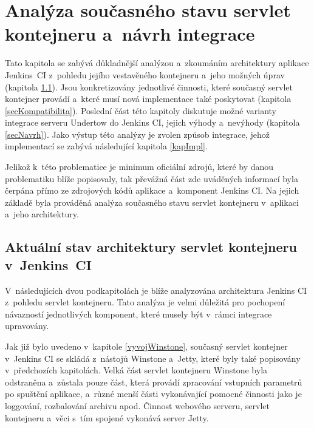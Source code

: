 \chapter{Analýza současného stavu servlet kontejneru a~návrh integrace}
    Tato kapitola se zabývá důkladnější analýzou a~zkoumáním architektury aplikace Jenkins~CI
    z~pohledu jejího vestavěného kontejneru a~jeho možných úprav (kapitola \ref{secArchitecture}). 
    Jsou konkretizovány jednotlivé činnosti, které současný servlet kontejner provádí
    a~které musí nová implementace také poskytovat (kapitola \ref{secKompatibilita}).
    Poslední část této kapitoly diskutuje možné varianty integrace serveru Undertow do Jenkins CI,
    jejich výhody a~nevýhody (kapitola \ref{secNavrh}). Jako výstup této analýzy je zvolen způsob integrace, jehož
    implementací se zabývá následující kapitola \ref{kapImpl}.

    Jelikož k~této problematice je minimum oficiální zdrojů, které by danou problematiku blíže popisovaly, 
    tak převážná část zde uváděných informací byla čerpána přímo ze zdrojových kódů aplikace a~komponent Jenkins CI.
    Na jejich základě byla prováděná analýza současného stavu servlet kontejneru v~aplikaci a~jeho architektury.
    
    \section{Aktuální stav architektury servlet kontejneru v~Jenkins~CI}\label{secArchitecture}
        V~následujících dvou podkapitolách je blíže analyzována architektura
        Jenkins CI z~pohledu servlet kontejneru. Tato analýza je velmi důležitá
        pro pochopení návazností jednotlivých komponent, které musely být v~rámci integrace upravovány.

        Jak již bylo uvedeno v~kapitole \ref{vyvojWinstone}, současný servlet kontejner 
        v~Jenkins CI se skládá z~nástojů Winstone a~Jetty, které byly také popisovány
        v~předchozích kapitolách. Velká část servlet
        kontejneru Winstone byla odstraněna a~zůstala pouze část, která
        provádí zpracování vstupních parametrů po spuštění aplikace, a~různé menší části
        vykonávající pomocné činnosti jako je loggování, rozbalování archivu apod. Činnost webového serveru, servlet kontejneru
        a~věci s~tím spojené vykonává server Jetty.
        

